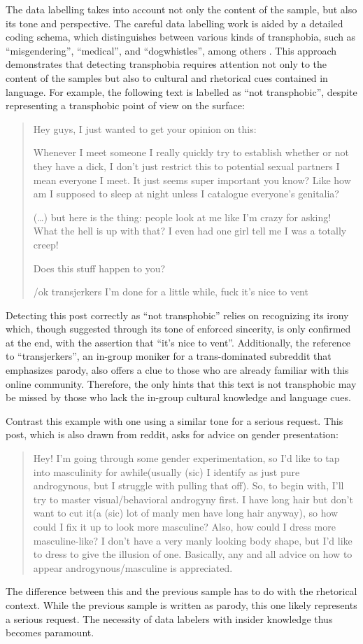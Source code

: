 \documentclass[11pt]{article}
\begin{document}
The data labelling takes into account not only the content of the sample, but also its tone and perspective. The careful data labelling work is aided by a detailed coding schema, which distinguishes between various kinds of transphobia, such as “misgendering”, “medical”, and “dogwhistles”, among others \citep{lameiro:2025}. This approach demonstrates that detecting transphobia requires attention not only to the content of the samples but also to cultural and rhetorical cues contained in language. For example, the following text is labelled as “not transphobic”, despite representing a transphobic point of view on the surface:
\begin{quote}
Hey guys, I just wanted to get your opinion on this:

Whenever I meet someone I really quickly try to establish whether or not they have a dick, I don’t just restrict this to potential sexual partners I mean everyone I meet. It just seems super important you know? Like how am I supposed to sleep at night unless I catalogue everyone’s genitalia?

(…) but here is the thing: people look at me like I’m crazy for asking! What the hell is up with that? I even had one girl tell me I was a totally creep!

Does this stuff happen to you?

/ok transjerkers I’m done for a little while, fuck it’s nice to vent
\end{quote}
Detecting this post correctly as “not transphobic” relies on recognizing its irony which, though suggested through its tone of enforced sincerity, is only confirmed at the end, with the assertion that “it’s nice to vent”. Additionally, the reference to “transjerkers”, an in-group moniker for a trans-dominated subreddit that emphasizes parody, also offers a clue to those who are already familiar with this online community. Therefore, the only hints that this text is not transphobic may be missed by those who lack the in-group cultural knowledge and language cues.

Contrast this example with one using a similar tone for a serious request. This post, which is also drawn from reddit, asks for advice on gender presentation:
\begin{quote}
Hey! I’m going through some gender experimentation, so I’d like to tap into masculinity for awhile(usually (sic) I identify as just pure androgynous, but I struggle with pulling that off). So, to begin with, I’ll try to master visual/behavioral androgyny first. I have long hair but don’t want to cut it(a (sic) lot of manly men have long hair anyway), so how could I fix it up to look more masculine? Also, how could I dress more masculine-like? I don’t have a very manly looking body shape, but I’d like to dress to give the illusion of one. Basically, any and all advice on how to appear androgynous/masculine is appreciated.
\end{quote}
The difference between this and the previous sample has to do with the rhetorical context. While the previous sample is written as parody, this one likely represents a serious request. The necessity of data labelers with insider knowledge thus becomes paramount.
\end{document}
